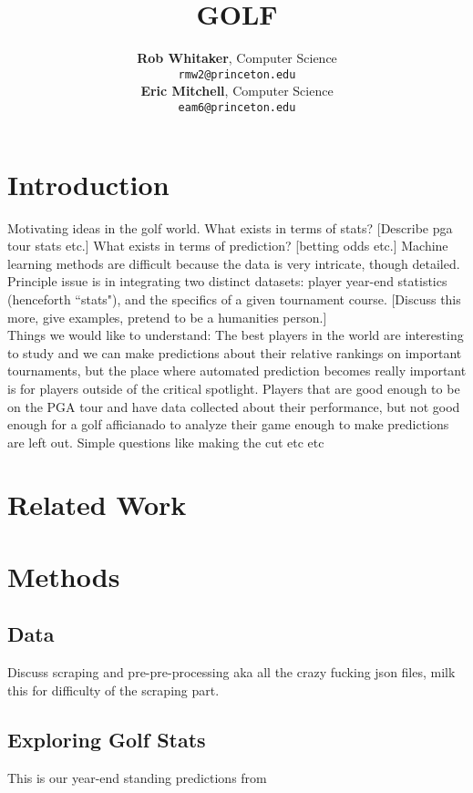 \documentclass[margin = 0.5in] {article}%
\title{GOLF  }
\author{
\textbf{Rob Whitaker}, 
Computer Science \\
\texttt{rmw2@princeton.edu} \\
\textbf{Eric Mitchell}, 
Computer Science \\
\texttt{eam6@princeton.edu} \\
}
\begin{document}
\maketitle

\begin{abstract}
\end{abstract}

\section{Introduction}
Motivating ideas in the golf world.  What exists in terms of stats?  [Describe pga tour stats etc.] What exists in terms of prediction? [betting odds etc.]  Machine learning methods are difficult because the data is very intricate, though detailed.\\

Principle issue is in integrating two distinct datasets: player year-end statistics (henceforth ``stats"), and the specifics of a given tournament course.  [Discuss this more, give examples, pretend to be a humanities person.] \\

Things we would like to understand: The best players in the world are interesting to study and we can make predictions about their relative rankings on important tournaments, but the place where automated prediction becomes really important is for players outside of the critical spotlight.  Players that are good enough to be on the PGA tour and have data collected about their performance, but not good enough for a golf afficianado to analyze their game enough to make predictions are left out.  Simple questions like making the cut etc etc

\section{Related Work}

\section{Methods}
\subsection{Data}
Discuss scraping and pre-pre-processing aka all the crazy fucking json files, milk this for difficulty of the scraping part.

\subsection{Exploring Golf Stats}
This is our year-end standing predictions from 
\end{document}
